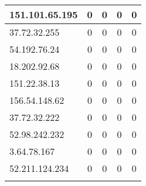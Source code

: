 \documentclass{article}
\begin{document}
\begin{longtable}{|>{\raggedright\arraybackslash}p{3cm}|c|c|c|c|}
    
    \rowcolor{lightgreen} %
    
    151.101.65.195 & 0 & 0 & 0 & 0 \\
    \hline
    
    
    \rowcolor{lightgreen} %
    
    37.72.32.255 & 0 & 0 & 0 & 0 \\
    \hline
    
    
    \rowcolor{lightgreen} %
    
    54.192.76.24 & 0 & 0 & 0 & 0 \\
    \hline
    
    
    \rowcolor{lightgreen} %
    
    18.202.92.68 & 0 & 0 & 0 & 0 \\
    \hline
    
    
    \rowcolor{lightgreen} %
    
    151.22.38.13 & 0 & 0 & 0 & 0 \\
    \hline
    
    
    \rowcolor{lightgreen} %
    
    156.54.148.62 & 0 & 0 & 0 & 0 \\
    \hline
    
    
    \rowcolor{lightgreen} %
    
    37.72.32.222 & 0 & 0 & 0 & 0 \\
    \hline
    
    
    \rowcolor{lightgreen} %
    
    52.98.242.232 & 0 & 0 & 0 & 0 \\
    \hline
    
    
    \rowcolor{lightgreen} %
    
    3.64.78.167 & 0 & 0 & 0 & 0 \\
    \hline
    
    
    \rowcolor{lightgreen} %
    
    52.211.124.234 & 0 & 0 & 0 & 0 \\
    \hline
    
    
    \rowcolor{lightgreen} %
    

\end{longtable}
\end{document}
